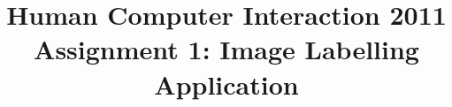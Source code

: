 \title{\vspace{-0.05\textheight}Human Computer Interaction 2011\\\large{Assignment 1: Image Labelling Application}}

\author{
\\
\\
}
